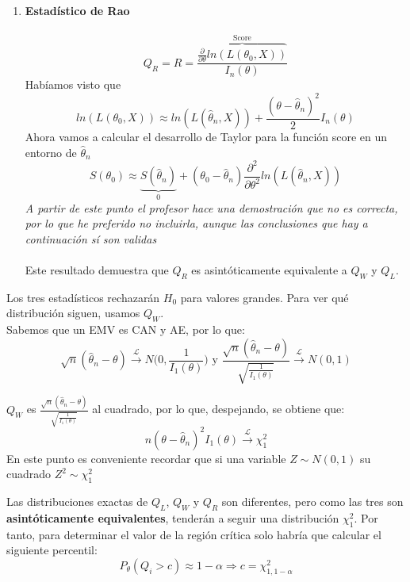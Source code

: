 \begin{enumerate}
    \item \textbf{Estadístico de Rao}\\\ \\
    $$Q_R=R=\frac{\overbrace{\frac{\partial}{\partial\theta}ln(L(\theta_0,X))}^{\text{Score}}}{I_n(\theta)}$$
    Habíamos visto que 
    $$ln(L(\theta_0,X))\approx ln(L(\hat\theta_n,X))+\frac{(\theta-\hat\theta_n)^2}{2}I_n(\theta)$$
    Ahora vamos a calcular el desarrollo de Taylor para la función score en un entorno de $\hat\theta_n$
    $$S(\theta_0)\approx \underbrace{S(\hat\theta_n)}_{0}+(\theta_0-\hat\theta_n)\frac{\partial^2}{\partial\theta^2}ln(L(\hat\theta_n,X))$$
    \textit{A partir de este punto el profesor hace una demostración que no es correcta, por lo que he preferido no incluirla, aunque las conclusiones que hay a continuación sí son validas}\\\ \\
    Este resultado demuestra que $Q_R$ es asintóticamente equivalente a $Q_W$ y $Q_L$. 
\end{enumerate}

Los tres estadísticos rechazarán $H_0$ para valores grandes. Para ver qué distribución siguen, usamos $Q_W$.\\
Sabemos que un EMV es CAN y AE, por lo que:
$$\sqrt{n}(\hat\theta_n-\theta)\overset{\mathcal{L}}{\longrightarrow}N\Big(0,\frac{1}{I_1(\theta)}\Big)\text{ y }\frac{\sqrt{n}(\hat\theta_n-\theta)}{\sqrt{\frac{1}{I_1(\theta)}}}\overset{\mathcal{L}}{\longrightarrow}N(0,1)$$

$Q_W$ es $\displaystyle\frac{\sqrt{n}(\hat\theta_n-\theta)}{\sqrt{\frac{1}{I_1(\theta)}}}$ al cuadrado, por lo que, despejando, se obtiene que:
$$n(\theta-\hat\theta_n)^2I_1(\theta)\overset{\mathcal{L}}{\longrightarrow}\chi^2_1$$
En este punto es conveniente recordar que si una variable $Z\sim N(0,1)$ su cuadrado $Z^2\sim \chi^2_1$

Las distribuciones exactas de $Q_L$, $Q_W$ y $Q_R$ son diferentes, pero como las tres son \textbf{asintóticamente equivalentes}, tenderán a seguir una distribución $\chi^2_1$. 
Por tanto, para determinar el valor de la región crítica solo habría que calcular el siguiente percentil:
$$P_{\theta}(Q_i>c)\approx 1-\alpha\Longrightarrow  c=\chi^2_{1,1-\alpha}$$
